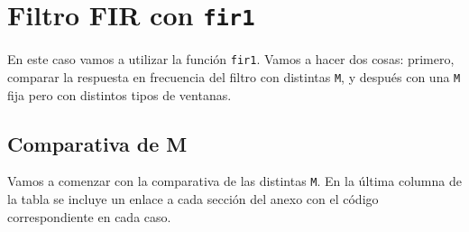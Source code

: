 \documentclass[11pt,a4paper]{article}
\begin{document}
\newpage

\section{Filtro FIR con \texttt{fir1}}

En este caso vamos a utilizar la función \texttt{fir1}. Vamos a hacer dos cosas: primero, comparar la respuesta en frecuencia del filtro con distintas \texttt{M}, y después con una \texttt{M} fija pero con distintos tipos de ventanas.

\subsection{Comparativa de M}

Vamos a comenzar con la comparativa de las distintas \texttt{M}. En la última columna de la tabla se incluye un enlace a cada sección del anexo con el código correspondiente en cada caso.
\end{document}

